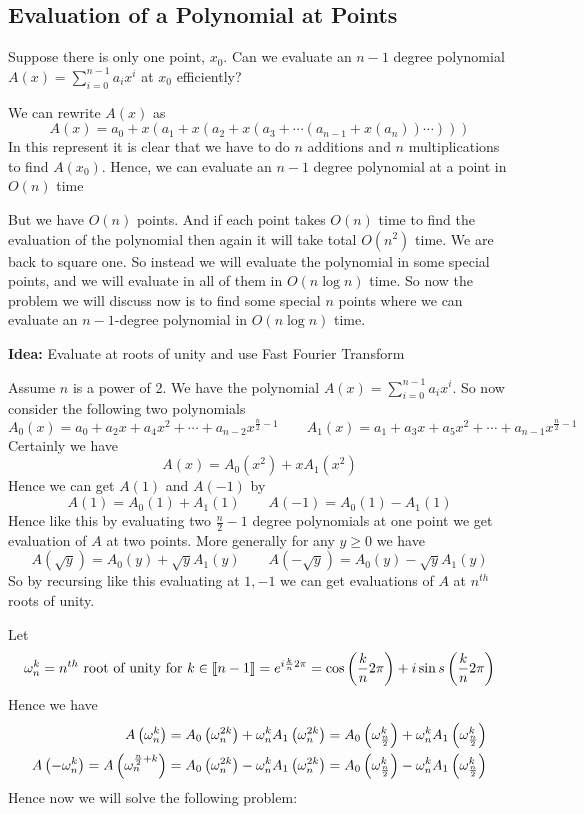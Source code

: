 \subsection{Evaluation of a Polynomial at Points}\label{fft}
\begin{question}{}{}
	Suppose there is only one point, $x_0$. Can we evaluate an $n-1$ degree polynomial $A(x)=\sum\limits_{i=0}^{n-1}a_ix^i$ at $x_0$ efficiently?
\end{question}
We can rewrite $A(x)$ as $$A(x)=a_0+x(a_1+x(a_2+x(a_3+\cdots (a_{n-1}+x(a_n))\cdots )))$$In this represent it is clear that we have to do $n$ additions and $n$ multiplications to find $A(x_0)$. Hence, we can evaluate an $n-1$ degree polynomial at a point in $O(n)$ time


But we have $O(n)$ points. And if each point takes $O(n)$ time to find the evaluation of the polynomial then again it will take total $O(n^2)$ time. We are back to square one. So instead we will evaluate the polynomial in some special points, and we will evaluate in all of them in $O(n\log n)$ time. So now the problem we will discuss now is to find some special $n$ points where we can evaluate an $n-1$-degree polynomial in $O(n\log n)$ time.
\parinf

\textbf{Idea:} Evaluate at roots of unity and use Fast Fourier Transform
\parinn

Assume $n$ is a power of 2. We have the polynomial $A(x)=\sum\limits_{i=0}^{n-1}a_ix^i$. So now consider the following two polynomials $$A_0(x)=a_0+a_2x+a_4x^2+\cdots+a_{n-2}x^{\frac{n}2-1}\qquad A_1(x)=a_1+a_3x+a_5x^2+\cdots+a_{n-1}x^{\frac{n}2-1}$$Certainly we have $$A(x)=A_0(x^2)+xA_1(x^2)$$Hence we can get $A(1)$ and $A(-1)$ by $$A(1)=A_0(1)+A_1(1)\qquad A(-1)=A_0(1)-A_1(1)$$Hence like this by evaluating two $\frac{n}2-1$ degree polynomials at one point we get evaluation of $A$ at two points. More generally for any $y\geq 0$ we have$$A(\sqrt{y})=A_0(y)+\sqrt{y}A_1(y)\qquad A(-\sqrt{y})=A_0(y)-\sqrt{y}A_1(y)$$So by recursing like this evaluating at $1,-1$ we can get evaluations of $A$ at $n^{th}$ roots of unity.

Let $$\omega_n^k=n^{th}\text{ root of unity for }k\in\llbracket n-1\rrbracket = e^{i\frac{k}{n}2\pi}=\cos\left(\frac{k}{n}2\pi\right)+i\sin s\left(\frac{k}{n}2\pi\right)$$Hence we have \begin{align*}
	A\left(\omega_n^k\right)                               & =A_0\left(\omega_n^{2k}\right)+\omega_n^kA_1\left(\omega_n^{2k}\right)=A_0\left(\omega_{\frac{n}2}^{k}\right)+\omega_n^kA_1\left(\omega_{\frac{n}2}^{k}\right) \\
	A\left(-\omega_n^k\right)=A\left(\omega_n^{\frac{n}2+k}\right) & =A_0\left(\omega_n^{2k}\right)-\omega_n^kA_1\left(\omega_n^{2k}\right)=A_0\left(\omega_{\frac{n}2}^{k}\right)-\omega_n^kA_1\left(\omega_{\frac{n}2}^{k}\right)
\end{align*}Hence now we will solve the following problem:
\begin{algoprob}
\end{algoprob}


